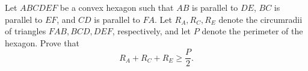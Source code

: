 Let $ ABCDEF$ be a convex hexagon such that $ AB$ is parallel to  $ DE$,  $ BC$ is parallel to $ EF$,  and $ CD$ is parallel to $ FA$. Let  $ R_{A},R_{C},R_{E}$ denote the circumradii of triangles $ FAB,BCD,DEF$,  respectively, and let $ P$ denote the perimeter of the hexagon. Prove that\[ R_{A} + R_{C} + R_{E}\geq \frac {P}{2}.\]
